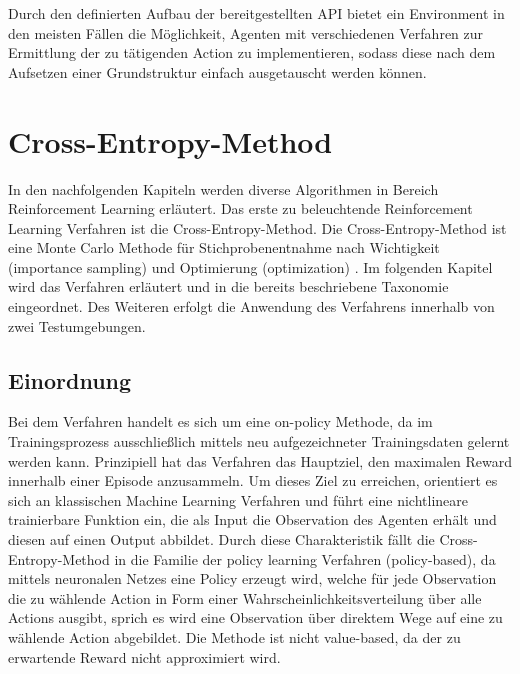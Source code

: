 \documentclass[11pt]{scrartcl}
\begin{document}
Durch den definierten Aufbau der bereitgestellten API bietet ein Environment in den meisten Fällen
die Möglichkeit, Agenten mit verschiedenen Verfahren zur Ermittlung der zu tätigenden Action zu
implementieren, sodass diese nach dem Aufsetzen einer Grundstruktur einfach ausgetauscht werden
können.


\newpage
\section{Cross-Entropy-Method}
\label{sec:cross-entropy-method}
In den nachfolgenden Kapiteln werden diverse Algorithmen in Bereich Reinforcement Learning
erläutert. Das erste zu beleuchtende Reinforcement Learning Verfahren ist die
Cross-Entropy-Method. Die Cross-Entropy-Method ist eine Monte Carlo Methode für
Stichprobenentnahme nach Wichtigkeit (importance sampling) und Optimierung (optimization)
\cite[~S.29 ff.]{R2004}. Im folgenden Kapitel wird das Verfahren erläutert und in die bereits
beschriebene Taxonomie eingeordnet. Des Weiteren erfolgt die Anwendung des Verfahrens innerhalb
von zwei Testumgebungen. 

\subsection{Einordnung}
Bei dem Verfahren handelt es sich um eine on-policy Methode, da im Trainingsprozess ausschließlich
mittels neu aufgezeichneter Trainingsdaten gelernt werden kann. Prinzipiell hat das Verfahren das
Hauptziel, den maximalen Reward innerhalb einer Episode anzusammeln. Um dieses Ziel zu erreichen,
orientiert es sich an klassischen Machine Learning Verfahren und führt eine nichtlineare trainierbare
Funktion ein, die als Input die Observation des Agenten erhält und diesen auf einen Output abbildet.
Durch diese Charakteristik fällt die Cross-Entropy-Method in die Familie der policy learning Verfahren
(policy-based), da mittels neuronalen Netzes eine Policy erzeugt wird, welche für jede Observation die
zu wählende Action in Form einer Wahrscheinlichkeitsverteilung über alle Actions ausgibt, sprich es
wird eine Observation über direktem Wege auf eine zu wählende Action abgebildet. Die
Methode ist nicht value-based, da der zu erwartende Reward nicht approximiert wird.
\end{document}
